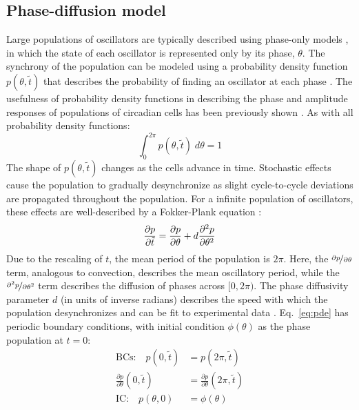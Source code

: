 \documentclass[11pt, letterpaper]{article}
\begin{document}
\subsection*{Phase-diffusion model}
Large populations of oscillators are typically described using phase-only models \cite{Rougemont2006}, in which the state of each oscillator is represented only by its phase, $\theta$.
The synchrony of the population can be modeled using a probability density function $p(\theta, \tilde{t})$ that describes the probability of finding an oscillator at each phase \cite{Kuramoto1984}.
The usefulness of probability density functions in describing the phase and amplitude responses of populations of circadian cells has been previously shown \cite{Ukai2007}.
As with all probability density functions:
\begin{equation}
  \int_0^{2\pi} p(\theta, \tilde{t}) \; d\theta = 1
\end{equation}
The shape of $p(\theta, \tilde{t})$ changes as the cells advance in time.
Stochastic effects cause the population to gradually desynchronize as slight cycle-to-cycle deviations are propagated throughout the population.
For a infinite population of oscillators, these effects are well-described by a Fokker-Plank equation \cite{Stein1965}:
\begin{equation}
  \frac{\partial p}{\partial \tilde{t}} = \frac{\partial p}{\partial \theta} + d\frac{\partial^2 p}{\partial \theta^2}\\
  \label{eq:pde}
\end{equation}
Due to the rescaling of $t$, the mean period of the population is $2\pi$.
Here, the $\nicefrac{\partial p}{\partial \theta}$ term, analogous to convection, describes the mean oscillatory period, while the $\nicefrac{\partial^2 p}{\partial \theta^2}$ term describes the diffusion of phases across $[0, 2\pi)$.
The phase diffusivity parameter $d$ (in units of inverse radians) describes the speed with which the population desynchronizes and can be fit to experimental data \cite{Rougemont2007}.
Eq.~\ref{eq:pde} has periodic boundary conditions, with initial condition $\phi(\theta)$ as the phase population at $t=0$:
\begin{align}
  \text{BCs:}\quad p(0, \tilde{t}) &= p(2\pi, \tilde{t}) \\
  \frac{\partial p}{\partial \theta}(0, \tilde{t}) &= \frac{\partial p}{\partial \theta}(2\pi, \tilde{t}) \\
  \text{IC:}\quad p(\theta, 0) &= \phi(\theta)\label{eq:pde_ic}
\end{align}
\end{document}
